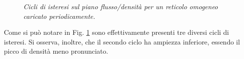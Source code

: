 \documentclass[../main.tex]{subfiles}
\begin{document}
\begin{figure}[H]
    \centering
    \caption[Isteresi per un reticolo omogeneo caricato periodicamente]{\emph{Cicli di isteresi sul piano flusso/densit\`a per un reticolo omogeneo caricato periodicamente.}}
    \label{fig:hysteresys_periodic_homo}
\end{figure}
Come si pu\`o notare in Fig. \ref{fig:hysteresys_periodic_homo} sono effettivamente presenti tre diversi cicli di isteresi.
Si osserva, inoltre, che il secondo ciclo ha ampiezza inferiore, essendo il picco di densit\`a meno pronunciato.
\end{document}

